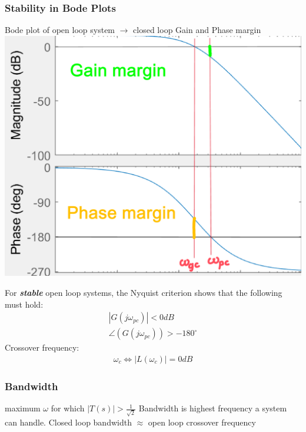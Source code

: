     \subsubsection{Stability in Bode Plots}
        \begin{minipage}{0.64 \linewidth}
                Bode plot of open loop system $\rightarrow$ closed loop Gain and Phase margin
                \includegraphics[width = \linewidth]{src/images/gain_phase_margin.png}
        \end{minipage}
        \begin{minipage}{0.34 \linewidth}
            For \textbf{\textit{stable}} open loop systems, the Nyquist criterion shows that the following must hold:
            \begin{align*}
                |G(j \omega_{pc})| < 0 dB\\
                \angle(G(j \omega_{pc})) > -180^{\circ}
            \end{align*}
            Crossover frequency:
            \begin{align*}
                \omega_{c} \Leftrightarrow |L(\omega_c)| = 0dB
            \end{align*}
        \end{minipage}

    

    \subsubsection{Bandwidth}
        maximum $\omega$ for which $|T(s)| > \frac{1}{\sqrt{2}}$
        Bandwidth is highest frequency a system can handle. Closed loop bandwidth $\approx$ open loop crossover frequency
        